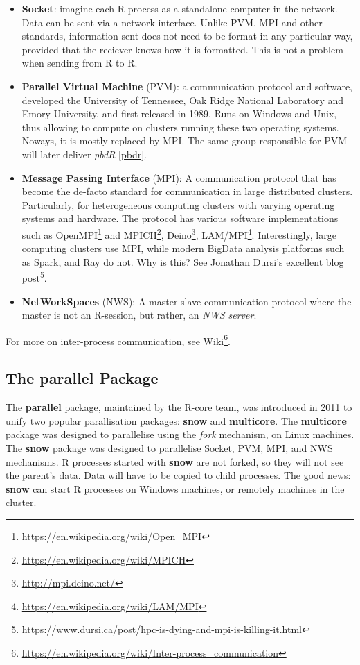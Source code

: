 \documentclass[]{book}
\renewcommand{\href}[2]{#2\footnote{\url{#1}}}
\theoremstyle{definition}
\theoremstyle{definition}
\theoremstyle{definition}
\theoremstyle{remark}
\begin{document}
\begin{itemize}
\item
  \textbf{Socket}: imagine each R process as a standalone computer in the network. Data can be sent via a network interface. Unlike PVM, MPI and other standards, information sent does not need to be format in any particular way, provided that the reciever knows how it is formatted. This is not a problem when sending from R to R.
\item
  \textbf{Parallel Virtual Machine} (PVM): a communication protocol and software, developed the University of Tennessee, Oak Ridge National Laboratory and Emory University, and first released in 1989. Runs on Windows and Unix, thus allowing to compute on clusters running these two operating systems. Noways, it is mostly replaced by MPI. The same group responsible for PVM will later deliver \emph{pbdR} \ref{pbdr}.
\item
  \textbf{Message Passing Interface} (MPI): A communication protocol that has become the de-facto standard for communication in large distributed clusters. Particularly, for heterogeneous computing clusters with varying operating systems and hardware. The protocol has various software implementations such as \href{https://en.wikipedia.org/wiki/Open_MPI}{OpenMPI} and \href{https://en.wikipedia.org/wiki/MPICH}{MPICH}, \href{http://mpi.deino.net/}{Deino}, \href{https://en.wikipedia.org/wiki/LAM/MPI}{LAM/MPI}. Interestingly, large computing clusters use MPI, while modern BigData analysis platforms such as Spark, and Ray do not. Why is this? See Jonathan Dursi's excellent \href{https://www.dursi.ca/post/hpc-is-dying-and-mpi-is-killing-it.html}{blog post}.
\item
  \textbf{NetWorkSpaces} (NWS): A master-slave communication protocol where the master is not an R-session, but rather, an \emph{NWS server}.
\end{itemize}

For more on inter-process communication, see \href{https://en.wikipedia.org/wiki/Inter-process_communication}{Wiki}.

\hypertarget{the-parallel-package}{%
\subsection{The parallel Package}\label{the-parallel-package}}

The \textbf{parallel} package, maintained by the R-core team, was introduced in 2011 to unify two popular parallisation packages: \textbf{snow} and \textbf{multicore}.
The \textbf{multicore} package was designed to parallelise using the \emph{fork} mechanism, on Linux machines.
The \textbf{snow} package was designed to parallelise Socket, PVM, MPI, and NWS mechanisms.
R processes started with \textbf{snow} are not forked, so they will not see the parent's data.
Data will have to be copied to child processes.
The good news: \textbf{snow} can start R processes on Windows machines, or remotely machines in the cluster.
\end{document}
